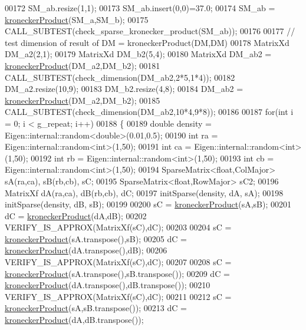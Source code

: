 \begin{DoxyCode}
00172   SM\_ab.resize(1,1);
00173   SM\_ab.insert(0,0)=37.0;
00174   SM\_ab = \hyperlink{namespace_eigen_aedd4b7cd1e324ed0769cac2701f4d050}{kroneckerProduct}(SM\_a,SM\_b);
00175   CALL\_SUBTEST(check\_sparse\_kronecker\_product(SM\_ab));
00176 
00177   \textcolor{comment}{// test dimension of result of DM = kroneckerProduct(DM,DM)}
00178   MatrixXd DM\_a2(2,1);
00179   MatrixXd DM\_b2(5,4);
00180   MatrixXd DM\_ab2 = \hyperlink{namespace_eigen_aedd4b7cd1e324ed0769cac2701f4d050}{kroneckerProduct}(DM\_a2,DM\_b2);
00181   CALL\_SUBTEST(check\_dimension(DM\_ab2,2*5,1*4));
00182   DM\_a2.resize(10,9);
00183   DM\_b2.resize(4,8);
00184   DM\_ab2 = \hyperlink{namespace_eigen_aedd4b7cd1e324ed0769cac2701f4d050}{kroneckerProduct}(DM\_a2,DM\_b2);
00185   CALL\_SUBTEST(check\_dimension(DM\_ab2,10*4,9*8));
00186   
00187   \textcolor{keywordflow}{for}(\textcolor{keywordtype}{int} i = 0; i < g\_repeat; i++)
00188   \{
00189     \textcolor{keywordtype}{double} density = Eigen::internal::random<double>(0.01,0.5);
00190     \textcolor{keywordtype}{int} ra = Eigen::internal::random<int>(1,50);
00191     \textcolor{keywordtype}{int} ca = Eigen::internal::random<int>(1,50);
00192     \textcolor{keywordtype}{int} rb = Eigen::internal::random<int>(1,50);
00193     \textcolor{keywordtype}{int} cb = Eigen::internal::random<int>(1,50);
00194     SparseMatrix<float,ColMajor> sA(ra,ca), sB(rb,cb), sC;
00195     SparseMatrix<float,RowMajor> sC2;
00196     MatrixXf dA(ra,ca), dB(rb,cb), dC;
00197     initSparse(density, dA, sA);
00198     initSparse(density, dB, sB);
00199     
00200     sC = \hyperlink{namespace_eigen_aedd4b7cd1e324ed0769cac2701f4d050}{kroneckerProduct}(sA,sB);
00201     dC = \hyperlink{namespace_eigen_aedd4b7cd1e324ed0769cac2701f4d050}{kroneckerProduct}(dA,dB);
00202     VERIFY\_IS\_APPROX(MatrixXf(sC),dC);
00203     
00204     sC = \hyperlink{namespace_eigen_aedd4b7cd1e324ed0769cac2701f4d050}{kroneckerProduct}(sA.transpose(),sB);
00205     dC = \hyperlink{namespace_eigen_aedd4b7cd1e324ed0769cac2701f4d050}{kroneckerProduct}(dA.transpose(),dB);
00206     VERIFY\_IS\_APPROX(MatrixXf(sC),dC);
00207     
00208     sC = \hyperlink{namespace_eigen_aedd4b7cd1e324ed0769cac2701f4d050}{kroneckerProduct}(sA.transpose(),sB.transpose());
00209     dC = \hyperlink{namespace_eigen_aedd4b7cd1e324ed0769cac2701f4d050}{kroneckerProduct}(dA.transpose(),dB.transpose());
00210     VERIFY\_IS\_APPROX(MatrixXf(sC),dC);
00211     
00212     sC = \hyperlink{namespace_eigen_aedd4b7cd1e324ed0769cac2701f4d050}{kroneckerProduct}(sA,sB.transpose());
00213     dC = \hyperlink{namespace_eigen_aedd4b7cd1e324ed0769cac2701f4d050}{kroneckerProduct}(dA,dB.transpose());

\end{DoxyCode}
